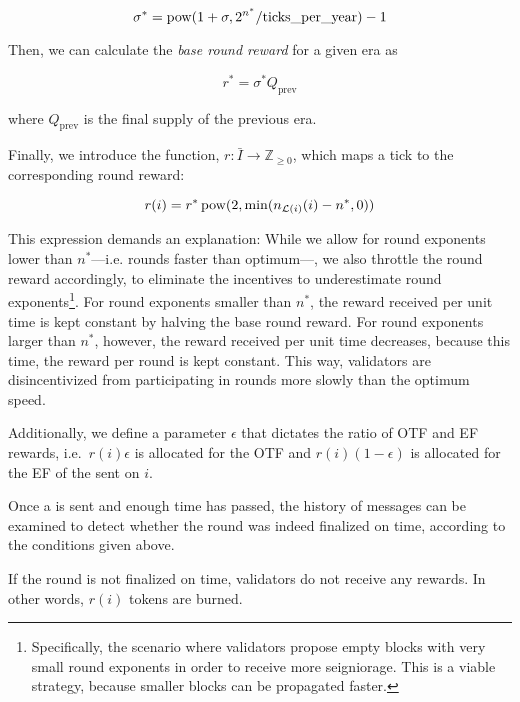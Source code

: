 \begin{equation}
  \sigma^\ast = \operatorname*{pow}(1 + \sigma, 2^{n^\ast}/\text{ticks\_per\_year}) - 1
\end{equation}

Then, we can calculate the \emph{base round reward} for a given era as

\begin{equation}
  r^\ast = \sigma^\ast Q_\text{prev}
\end{equation}

where $Q_\text{prev}$ is the final supply of the previous era.

Finally, we introduce the function, $r:\bar{I}\to \mathbb{Z}_{\geq 0}$, which maps a tick to the corresponding round reward:

\begin{equation}
  r(i) = r^\ast\operatorname*{pow}(2, {\min(n_{\mathcal{L}(i)}(i) - n^\ast, 0)})
\end{equation}

This expression demands an explanation: While we allow for round exponents lower than $n^\ast$---i.e. rounds faster than optimum---, we also throttle the round reward accordingly, to eliminate the incentives to underestimate round exponents\footnote{Specifically, the scenario where validators propose empty blocks with very small round exponents in order to receive more seigniorage. This is a viable strategy, because smaller blocks can be propagated faster.}. For round exponents smaller than $n^\ast$, the reward received per unit time is kept constant by halving the base round reward. For round exponents larger than $n^\ast$, however, the reward received per unit time decreases, because this time, the reward per round is kept constant. This way, validators are disincentivized from participating in rounds more slowly than the optimum speed.

Additionally, we define a parameter $\epsilon$ that dictates the ratio of OTF and EF rewards, i.e.~$r(i)\epsilon$ is allocated for the OTF and $r(i)(1-\epsilon)$ is allocated for the EF of the \PROP sent on $i$.

Once a \PROP is sent and enough time has passed, the history of messages can be examined to detect whether the round was indeed finalized on time, according to the conditions given above.

If the round is not finalized on time, validators do not receive any rewards. In other words, $r(i)$ tokens are burned.


